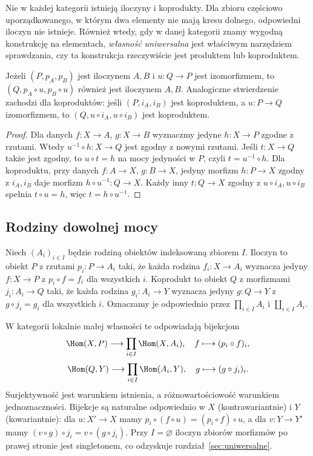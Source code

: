 \begin{uwaga}
Nie w każdej kategorii istnieją iloczyny i koprodukty. Dla zbioru częściowo uporządkowanego, w którym dwa elementy nie mają kresu dolnego, odpowiedni iloczyn nie istnieje. Również wtedy, gdy w danej kategorii znamy wygodną konstrukcję na elementach, \emph{własność uniwersalna} jest właściwym narzędziem sprawdzania, czy ta konstrukcja rzeczywiście jest produktem lub koproduktem.
\end{uwaga}

\begin{stwierdzenie}
Jeżeli $(P,p_A,p_B)$ jest iloczynem $A,B$ i $u:Q\to P$ jest izomorfizmem, to $(Q,p_A\circ u,p_B\circ u)$ również jest iloczynem $A,B$. Analogiczne stwierdzenie zachodzi dla koproduktów: jeśli $(P,i_A,i_B)$ jest koproduktem, a $u:P\to Q$ izomorfizmem, to $(Q,u\circ i_A,u\circ i_B)$ jest koproduktem.
\end{stwierdzenie}
\begin{proof}
Dla danych $f:X\to A$, $g:X\to B$ wyznaczmy jedyne $h:X\to P$ zgodne z rzutami. Wtedy $u^{-1}\circ h:X\to Q$ jest zgodny z nowymi rzutami. Jeśli $t:X\to Q$ także jest zgodny, to $u\circ t=h$ na mocy jedyności w $P$, czyli $t=u^{-1}\circ h$. Dla koproduktu, przy danych $f:A\to X$, $g:B\to X$, jedyny morfizm $h:P\to X$ zgodny z $i_A,i_B$ daje morfizm $h\circ u^{-1}:Q\to X$. Każdy inny $t:Q\to X$ zgodny z $u\circ i_A,u\circ i_B$ spełnia $t\circ u=h$, więc $t=h\circ u^{-1}$.
\end{proof}

\subsection{Rodziny dowolnej mocy}

\begin{definicja}\label{cat:def:indexed-products}
Niech $(A_i)_{i\in I}$ będzie rodziną obiektów indeksowaną zbiorem $I$. Iloczyn to obiekt $P$ z rzutami $p_i:P\to A_i$ taki, że każda rodzina $f_i:X\to A_i$ wyznacza jedyny $f:X\to P$ z $p_i\circ f=f_i$ dla wszystkich $i$. Koprodukt to obiekt $Q$ z morfizmami $j_i:A_i\to Q$ taki, że każda rodzina $g_i:A_i\to Y$ wyznacza jedyny $g:Q\to Y$ z $g\circ j_i=g_i$ dla wszystkich $i$. Oznaczamy je odpowiednio przez $\prod_{i\in I}A_i$ i $\coprod_{i\in I}A_i$.
\end{definicja}

W kategorii lokalnie małej własności te odpowiadają bijekcjom
\[
\Hom(X,P)\longrightarrow\prod_{i\in I}\Hom(X,A_i),
\quad f\longmapsto(p_i\circ f)_i,
\]
\[
\Hom(Q,Y)\longrightarrow\prod_{i\in I}\Hom(A_i,Y),
\quad g\longmapsto(g\circ j_i)_i.
\]
Surjektywność jest warunkiem istnienia, a różnowartościowość warunkiem jednoznaczności. Bijekcje są naturalne odpowiednio w $X$ (kontrawariantnie) i $Y$ (kowariantnie): dla $u:X'\to X$ mamy $p_i\circ(f\circ u)=(p_i\circ f)\circ u$, a dla $v:Y\to Y'$ mamy $(v\circ g)\circ j_i=v\circ(g\circ j_i)$. Przy $I=\varnothing$ iloczyn zbiorów morfizmów po prawej stronie jest singletonem, co odzyskuje rozdział~\ref{sec:uniwersalne}.

